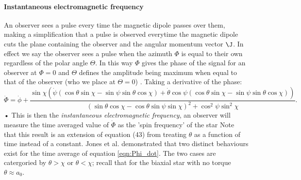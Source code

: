 \documentclass[/home/greg/Thesis/main/main.tex]{subfiles}
\begin{document}
\paragraph{Instantaneous electromagnetic frequency}
An observer sees a pulse every time the magnetic dipole passes over them, making a simplification that a pulse is observed everytime the magnetic dipole cuts the plane containing the observer and the angular momentum vector $\J$. In effect we say the observer sees a pulse when the azimuth $\Phi$ is equal to their own regardless of the polar angle $\Theta$. In this way $\Phi$ gives the phase of the signal for an observer at $\Phi=0$ and $\Theta$ defines the amplitude being maximum when equal to that of the observer (who we place at $\Theta= 0$) . %
Taking a derivative of the phase:
\begin{equation}
\dot{\Phi} = \dot{\phi} 
+ \frac{\sin\chi \left(
\dot{\psi}  (\cos\theta\sin\chi - \sin \psi \sin \theta \cos\chi) + 
\dot{\theta} \cos\psi (\cos\theta\sin\chi - \sin \psi \sin \theta \cos\chi)\right) 
}{(\sin\theta \cos \chi - \cos \theta \sin \psi \sin \chi)^{2} + \cos^{2}\psi \sin^{2} \chi}.
\label{eqn:Phi_dot}
\end{equation}•
This is then the \emph{instantaneous electromagnetic frequency},  an observer will measure the time averaged value of $\dot{\Phi}$ as the 'spin frequency' of the star
Note that this result is an extension of equation (43) from \cite{Jones2001} treating $\theta$ as a function of time instead of a constant. Jones et al. demonstrated that two distinct behaviours exist  for the time average of equation \eqref{eqn:Phi_dot}. The two cases are catergoried by $\theta > \chi$ or $\theta < \chi$; recall that for the biaxial star with no torque $\theta \approx a_{0}$.
\end{document}
